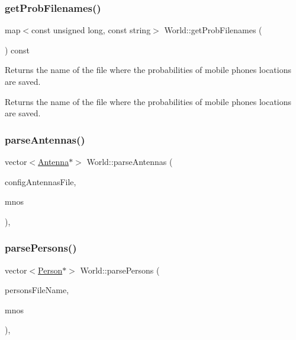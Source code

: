 \subsubsection{\texorpdfstring{getProbFilenames()}{getProbFilenames()}}
{\footnotesize\ttfamily map$<$const unsigned long, const string$>$ World\+::get\+Prob\+Filenames (\begin{DoxyParamCaption}{ }\end{DoxyParamCaption}) const}

Returns the name of the file where the probabilities of mobile phones locations are saved. \begin{DoxyReturn}{Returns}
the name of the file where the probabilities of mobile phones locations are saved. 
\end{DoxyReturn}
\mbox{\label{class_world_a65aeb82bc52e45f024bcb966cc111cfc}} 
\subsubsection{\texorpdfstring{parseAntennas()}{parseAntennas()}}
{\footnotesize\ttfamily vector$<$\mbox{\hyperlink{class_antenna}{Antenna}}$\ast$$>$ World\+::parse\+Antennas (\begin{DoxyParamCaption}\item[{const string \&}]{config\+Antennas\+File,  }\item[{vector$<$ \mbox{\hyperlink{class_mobile_operator}{Mobile\+Operator}} $\ast$ $>$}]{mnos }\end{DoxyParamCaption})\hspace{0.3cm}{\ttfamily [private]}, {\ttfamily [noexcept]}}

\mbox{\label{class_world_ac1ff7166ee1c03da452c0454f471fcef}} 
\subsubsection{\texorpdfstring{parsePersons()}{parsePersons()}}
{\footnotesize\ttfamily vector$<$\mbox{\hyperlink{class_person}{Person}}$\ast$$>$ World\+::parse\+Persons (\begin{DoxyParamCaption}\item[{const string \&}]{persons\+File\+Name,  }\item[{vector$<$ \mbox{\hyperlink{class_mobile_operator}{Mobile\+Operator}} $\ast$ $>$}]{mnos }\end{DoxyParamCaption})\hspace{0.3cm}{\ttfamily [private]}, {\ttfamily [noexcept]}}

